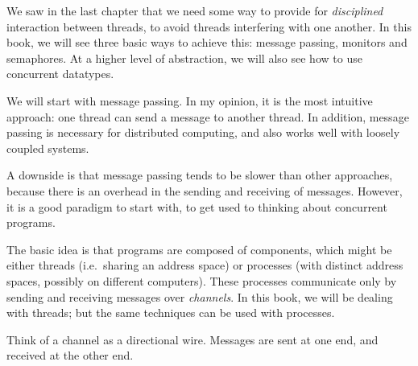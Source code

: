 
We saw in the last chapter that we need some way to provide for
\emph{disciplined} interaction between threads, to avoid threads interfering
with one another.  In this book, we will see three basic ways to achieve this:
message passing, monitors and semaphores.  At a higher level of abstraction,
we will also see how to use concurrent datatypes.

We will start with message passing.  In my opinion, it is the most intuitive
approach: one thread can send a message to another thread.  
In addition, message passing is  necessary for distributed computing, and also
works well with loosely coupled systems.  

A downside is that message passing tends to be slower than other approaches,
because there is an overhead in the sending and receiving of messages.
However, it is a good paradigm to start with, to get used to thinking about
concurrent programs.

The basic idea is that programs are composed of components, which might be
either threads (i.e.~sharing an address space) or processes (with distinct
address spaces, possibly on different computers).  These processes communicate
only by sending and receiving messages over \emph{channels}.  In this book, we
will be dealing with threads; but the same techniques can be used with
processes. 


Think of a channel as a directional wire.  Messages are sent at one end, and
received at the other end. 





